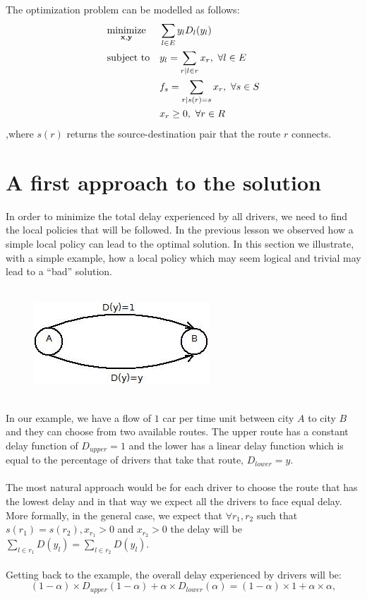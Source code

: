 The optimization problem can be modelled as follows:
\begin{equation}
\begin{aligned}
& \underset{\mathbf{x} , \mathbf{y} }{\text{minimize}}
	& &  \sum_{l \in E} y_{l} D_{l}(y_{l}) \\
& \text{subject to}
      & &  y_{l} = \sum_{r|l \in r} x_{r}, \text{  }\forall l \in E\\
&       & & f_{s} = \sum_{r|s(r) = s} x_{r}, \text{  }\forall s \in S\\
&      &&  x_{r} \geq 0 , \text{  }\forall r \in R\\
\end{aligned}
\label{e:prob}
\end{equation}
,where $s(r)$ returns the source-destination pair that the route $r$ connects.

\section{A first approach to the solution}

In order to minimize the total delay experienced by all drivers, we need to find the local policies that will be followed. In the previous lesson we observed how a simple local policy can lead to the optimal solution. In this section we illustrate, with a  simple example, how a local policy which may seem logical and trivial may lead to a ``bad'' solution.\\\\
\begin{figure}[h!]
\centering
\includegraphics[scale=.7]{FIG2.jpg}
\label{fig:2}
\end{figure}\\
In our example, we have a flow of $1$ car per time unit between city $A$ to city $B$ and they can choose from two available routes. The upper route has a constant delay function of $D_{upper}=1$ and the lower has a linear delay function which is equal to the percentage of drivers that take that  route, $D_{lower} = y$.\\\\
The most natural approach would be for each driver to choose the route that has the lowest delay and in that way we expect all the drivers to face equal delay. \\
More formally, in the general case, we expect that $\forall r_1, r_2$ such that $s(r_1) = s(r_2), x_{r_1} > 0$ and $x_{r_2} > 0$ the delay will be $\sum_{l \in r_1} D(y_l) =  \sum_{l \in r_2} D(y_l) $.\\\\
Getting back to the example, the overall delay experienced  by drivers will be:
\begin{equation}
\label{e:TotDelay}
	 (1-\alpha) \times  D_{upper}(1-\alpha)  + \alpha \times  D_{lower}(\alpha) = (1-\alpha) \times 1 + \alpha \times \alpha,
\end{equation}

